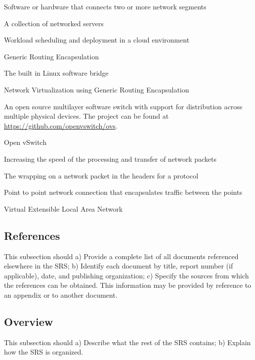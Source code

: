 \documentclass[10pt,letterpaper,onecolumn,draftclsnofoot]{IEEEtran}
\begin{document}
\begin{description}[leftmargin=12em,style=nextline]
	\item[Bridge]
		Software or hardware that connects two or more network segments
	\item [Cloud] 
		A collection of networked servers
	\item[Cloud Orchestration]
		Workload scheduling and deployment in a cloud environment
	\item[GRE] 
		Generic Routing Encapsulation
	\item[Linux Bridge]
		The built in Linux software bridge
	\item[nvGRE] 
		Network Virtualization using Generic Routing Encapsulation
	\item [Open vSwitch] 
		An open source multilayer software switch with support for distribution across multiple physical devices.
		The project can be found at \url{https://github.com/openvswitch/ovs}.
	\item[OVS] 
		Open vSwitch 
	\item[Packet Acceleration] 
		Increasing the speed of the processing and transfer of network packets
	\item[Packet Encapsulation]
		The wrapping on a network packet in the headers for a protocol
	\item [Tunnel]
		Point to point network connection that encapsulates traffic between the points
	\item[VxLAN] 
		Virtual Extensible Local Area Network
\end{description}

\subsection{References}

This subsection should
a) Provide a complete list of all documents referenced elsewhere in the SRS;
b) Identify each document by title, report number (if applicable), date, and publishing organization;
c) Specify the sources from which the references can be obtained.
This information may be provided by reference to an appendix or to another document.

\subsection{Overview}

This subsection should
a) Describe what the rest of the SRS contains;
b) Explain how the SRS is organized.
\clearpage
\end{document}
